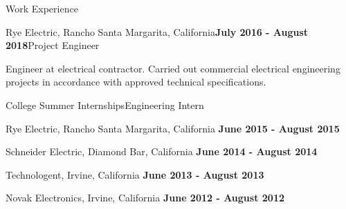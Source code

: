 \documentclass{resume} %
\begin{document}
\begin{rSection}{Work Experience}
		\begin{rSubsection}{Rye Electric, Rancho Santa Margarita, California}{\bf July 2016 - August 2018}{Project Engineer}{}
			\item Engineer at electrical contractor. Carried out commercial electrical engineering projects in accordance with approved technical specifications.
		\end{rSubsection}
		
		\begin{rSubsection}{College Summer Internships}{}{Engineering Intern} {}
			\item {Rye Electric, Rancho Santa Margarita, California} \hfill{\bf June 2015 - August 2015}
			\item {Schneider Electric, Diamond Bar, California} \hfill{\bf June 2014 - August 2014}
			\item {Technologent, Irvine, California} \hfill{\bf June 2013 - August 2013}
			\item {Novak Electronics, Irvine, California} \hfill{\bf June 2012 - August 2012}        
		\end{rSubsection}
		
	\end{rSection}
	
	\pagebreak
	
\end{document}
